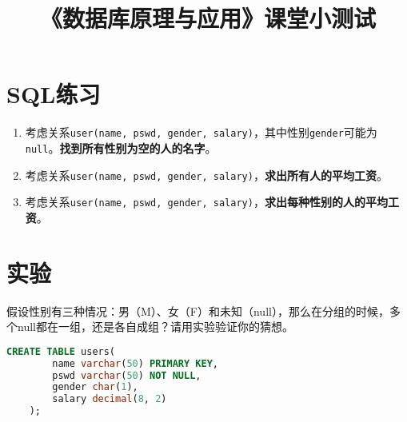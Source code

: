 \documentclass{article}
\title{《数据库原理与应用》课堂小测试}
\begin{document}
\maketitle

\section{SQL练习}

\begin{enumerate}
    \item 考虑关系\texttt{user(name, pswd, gender, salary)}，其中性别\texttt{gender}可能为\texttt{null}。\textbf{找到所有性别为空的人的名字}。
    \item 考虑关系\texttt{user(name, pswd, gender, salary)}，\textbf{求出所有人的平均工资}。
    \item 考虑关系\texttt{user(name, pswd, gender, salary)}，\textbf{求出每种性别的人的平均工资}。
\end{enumerate}

\section{实验}
假设性别有三种情况：男（M）、女（F）和未知（null），那么在分组的时候，多个null都在一组，还是各自成组？请用实验验证你的猜想。

\begin{lstlisting}[language=SQL]
    CREATE TABLE users(
        name varchar(50) PRIMARY KEY,
        pswd varchar(50) NOT NULL,
        gender char(1),
        salary decimal(8, 2)
    );
\end{lstlisting}
\end{document}
